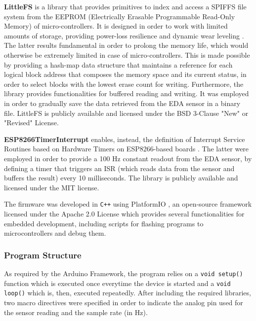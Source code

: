 \textbf{LittleFS} is a library that provides primitives to index and access a SPIFFS file system from the EEPROM (Electrically Erasable Programmable Read-Only Memory) of micro-controllers. It is designed in order to work with limited amounts of storage, providing power-loss resilience and dynamic wear leveling \cite{littlefs}. The latter results fundamental in order to prolong the memory life, which would otherwise be extremely limited in case of micro-controllers. This is made possible by providing a hash-map data structure that maintains a reference for each logical block address that composes the memory space and its current status, in order to select blocks with the lowest erase count for writing. Furthermore, the library provides functionalities for buffered reading and writing. It was employed in order to gradually save the data retrieved from the EDA sensor in a binary file.
LittleFS is publicly available and licensed under the BSD 3-Clause "New" or "Revised" License.

\vspace{8mm}

\textbf{ESP8266TimerInterrupt} enables, instead, the definition of Interrupt Service Routines based on Hardware Timers on ESP8266-based boards \cite{esp8266timerinterrupt}. The latter were employed in order to provide a 100 Hz constant readout from the EDA sensor, by defining a timer that triggers an ISR (which reads data from the sensor and buffers the result) every 10 milliseconds. The library is publicly available and licensed under the MIT license.

\vspace{8mm}

The firmware was developed in \texttt{C++} using PlatformIO \cite{platformio}, an open-source framework licensed under the Apache 2.0 License which provides several functionalities for embedded development, including scripts for flashing programs to microcontrollers and debug them.

\subsubsection{Program Structure}\label{subsubsec:program-structure}

As required by the Arduino Framework, the program relies on a \texttt{void setup()} function which is executed once everytime the device is started and a \texttt{void loop()} which is, then, executed repeatedly. After including the required libraries, two macro directives were specified in order to indicate the analog pin used for the sensor reading and the sample rate (in Hz).

